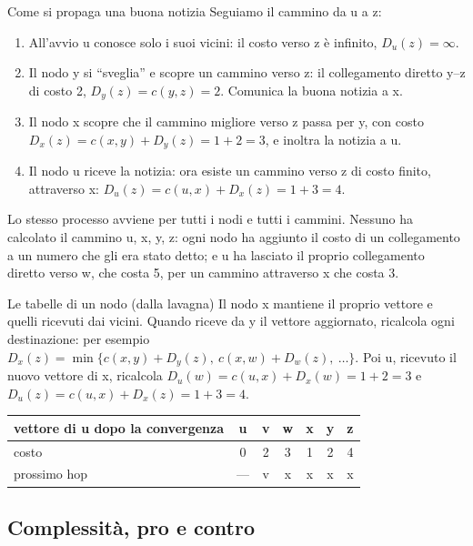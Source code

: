 \begin{esempio}{Come si propaga una buona notizia}
Seguiamo il cammino da u a z:
\begin{enumerate}
    \item All'avvio u conosce solo i suoi vicini: il costo verso z è infinito, $D_u(z) = \infty$.
    \item Il nodo y si ``sveglia'' e scopre un cammino verso z: il collegamento diretto y--z di costo 2, $D_y(z) = c(y,z) = 2$. Comunica
          la buona notizia a x.
    \item Il nodo x scopre che il cammino migliore verso z passa per y, con costo $D_x(z) = c(x,y) + D_y(z) = 1 + 2 = 3$, e inoltra
          la notizia a u.
    \item Il nodo u riceve la notizia: ora esiste un cammino verso z di costo finito, attraverso x:
          $D_u(z) = c(u,x) + D_x(z) = 1 + 3 = 4$.
\end{enumerate}
Lo stesso processo avviene per tutti i nodi e tutti i cammini. Nessuno ha calcolato il cammino u, x, y, z: ogni nodo ha
aggiunto il costo di un collegamento a un numero che gli era stato detto; e u ha lasciato il proprio collegamento diretto verso
w, che costa 5, per un cammino attraverso x che costa 3.
\end{esempio}

\begin{esempio}{Le tabelle di un nodo (dalla lavagna)}
Il nodo x mantiene il proprio vettore e quelli ricevuti dai vicini. Quando riceve da y il vettore aggiornato, ricalcola ogni
destinazione: per esempio $D_x(z) = \min\{c(x,y) + D_y(z),\ c(x,w) + D_w(z),\ \dots\}$. Poi u, ricevuto il nuovo vettore di x,
ricalcola $D_u(w) = c(u,x) + D_x(w) = 1 + 2 = 3$ e $D_u(z) = c(u,x) + D_x(z) = 1 + 3 = 4$.
\begin{center}
\begin{tabular}{l|cccccc}
\toprule
\textbf{vettore di u dopo la convergenza} & u & v & w & x & y & z \\
\midrule
costo & 0 & 2 & 3 & 1 & 2 & 4 \\
prossimo hop & --- & v & x & x & x & x \\
\bottomrule
\end{tabular}
\end{center}
\end{esempio}

\subsection{Complessità, pro e contro}

